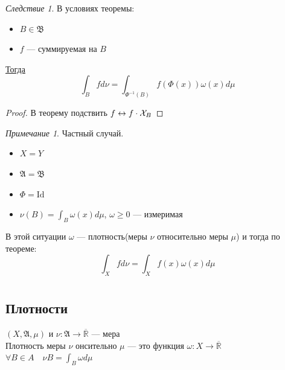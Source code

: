 \documentclass[oneside]{book}
\newcommand{\R}{\mathbb{R}}
\newcommand{\A}{\mathfrak{A}}
\newcommand{\B}{\mathfrak{B}}
\theoremstyle{plain}
\theoremstyle{remark}
\newtheorem*{remark}{Примечание}
\newtheorem{corollary}{Следствие}[theorem]
\theoremstyle{definition}
\begin{document}
\begin{corollary}
В условиях теоремы:
\begin{itemize}
\item \(B \in \B\)
\item \(f\) --- суммируемая на \(B\)
\end{itemize}
\uline{Тогда} \[ \int_B f d\nu = \int_{\Phi^{-1}(B)}f(\Phi(x))\omega(x)d\mu\]
\end{corollary}
\begin{proof}
В теорему подствить \(f \leftrightarrow f\cdot\X_{B}\)
\end{proof}
\begin{remark}
Частный случай.
\begin{itemize}
\item \(X = Y\)
\item \(\A = \B\)
\item \(\Phi = \text{Id}\)
\item \(\nu(B) = \int_B\omega(x)d\mu\), \(\omega \ge 0\) --- измеримая
\end{itemize}
В этой ситуации \(\omega\) --- плотность(меры \(\nu\) относительно меры \(\mu\)) и тогда по теореме:
\[ \int_X f d\nu = \int_X f(x)\omega(x)d\mu \]
\end{remark}
\chapter{}
\label{sec:orgff2134d}
\newcommand{\X}{\mathcal{X}}
\newcommand{\A}{\mathfrak{A}}
\newcommand{\B}{\mathfrak{B}}
\newcommand{\M}{\mathfrak{M}}

\section{Плотности}
\label{sec:orgea5ad21}

 \((X, \A, \mu)\) и \(\nu: \A \to \overline{\R}\) --- мера \\
Плотность  меры \(\nu\) онсительно \(\mu\) --- это функция \(\omega: X \to \overline{\R}\) \\
\(\forall B \in A\quad \nu B = \int_B \omega d\mu\)
\end{document}
